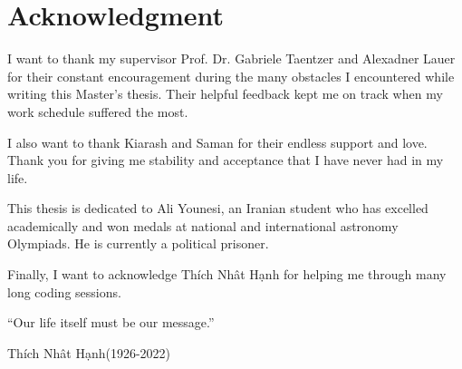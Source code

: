 \newpage
\section*{Acknowledgment}
I want to thank my supervisor Prof. Dr. Gabriele Taentzer and Alexadner Lauer for their constant encouragement during the many obstacles I encountered while writing this Master's thesis. Their helpful feedback kept me on track when my work schedule suffered the most.

I also want to thank Kiarash and Saman for their endless support and love. Thank you for giving me stability and acceptance that I have never had in my life.

This thesis is dedicated to Ali Younesi, an Iranian student who has excelled academically and won medals at national and international astronomy Olympiads. He is currently a political prisoner.

Finally, I want to acknowledge Th\'{i}ch Nh\^{a}t H\d{a}nh for helping me through many long coding sessions.
\newline
\newline
\newline
\newline
\newline
\newline
\newline
\newline
\newline
\newline
\newline
\begin{center}
\enquote{Our life itself must be our message.}
\end{center}
\hspace{200pt} Th\'{i}ch Nh\^{a}t H\d{a}nh(1926-2022)
